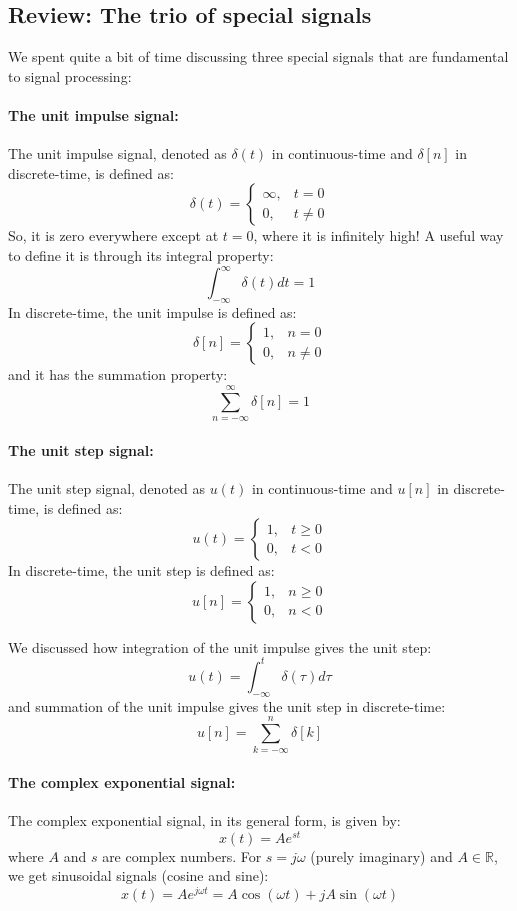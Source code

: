 \documentclass{ee102_notes}
\begin{document}
\subsection{Review: The trio of special signals}
We spent quite a bit of time discussing three special signals that are fundamental to signal processing:

\paragraph{The unit impulse signal:} The unit impulse signal, denoted as $\delta(t)$ in continuous-time and $\delta[n]$ in discrete-time, is defined as:
\[
\delta(t) = \begin{cases}
\infty, & t = 0 \\
0, & t \neq 0
\end{cases}
\]
So, it is zero everywhere except at $t = 0$, where it is infinitely high! A useful way to define it is through its integral property:
\[
\int_{-\infty}^{\infty} \delta(t) dt = 1
\]
In discrete-time, the unit impulse is defined as:
\[
\delta[n] = \begin{cases}
1, & n = 0 \\
0, & n \neq 0
\end{cases}
\]
and it has the summation property:
\[
\sum_{n=-\infty}^{\infty} \delta[n] = 1
\]

\paragraph{The unit step signal:} The unit step signal, denoted as $u(t)$ in continuous-time and $u[n]$ in discrete-time, is defined as:
\[
u(t) = \begin{cases}
1, & t \geq 0 \\
0, & t < 0
\end{cases}
\]
In discrete-time, the unit step is defined as:
\[
u[n] = \begin{cases}
1, & n \geq 0 \\
0, & n < 0
\end{cases}
\]

We discussed how integration of the unit impulse gives the unit step:
\[
u(t) = \int_{-\infty}^{t} \delta(\tau) d\tau
\]
and summation of the unit impulse gives the unit step in discrete-time:
\[
u[n] = \sum_{k=-\infty}^{n} \delta[k]
\]

\paragraph{The complex exponential signal:} The complex exponential signal, in its general form, is given by:
\[
x(t) = Ae^{st}
\]
where $A$ and $s$ are complex numbers. For $s = j\omega$ (purely imaginary) and $A \in \mathbb{R}$, we get sinusoidal signals (cosine and sine):
\[
x(t) = Ae^{j\omega t} = A\cos(\omega t) + jA\sin(\omega t)
\]
\end{document}
